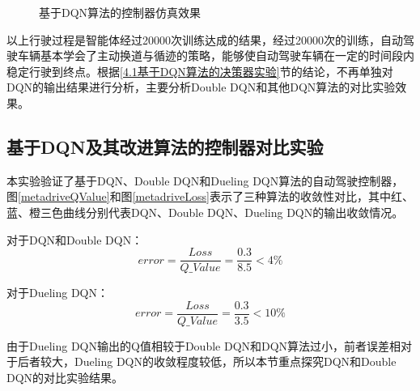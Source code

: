 \begin{figure}[htbp]
{    }
    \caption{基于DQN算法的控制器仿真效果}\label{基于DQN算法的控制器仿真效果} 
\end{figure}

以上行驶过程是智能体经过20000次训练达成的结果，经过20000次的训练，自动驾驶车辆基本学会了主动换道与循迹的策略，能够使自动驾驶车辆在一定的时间段内稳定行驶到终点。根据\ref{4.1基于DQN算法的决策器实验}节的结论，不再单独对DQN的输出结果进行分析，主要分析Double DQN和其他DQN算法的对比实验效果。

\subsection{基于DQN及其改进算法的控制器对比实验}

本实验验证了基于DQN、Double DQN和Dueling DQN算法的自动驾驶控制器，图\ref{metadriveQValue}和图\ref{metadriveLoss}表示了三种算法的收敛性对比，其中红、蓝、橙三色曲线分别代表DQN、Double DQN、Dueling DQN的输出收敛情况。

对于DQN和Double DQN：
\begin{equation}
    error = \frac{Loss}{Q\_Value} = \frac{0.3}{8.5} < 4\%
\end{equation}\label{dqn-controller-error}

对于Dueling DQN：
\begin{equation}
    error = \frac{Loss}{Q\_Value} = \frac{0.3}{3.5} < 10\%
\end{equation}\label{dueldqn-controller-error}

由于Dueling DQN输出的Q值相较于Double DQN和DQN算法过小，前者误差相对于后者较大，Dueling DQN的收敛程度较低，所以本节重点探究DQN和Double DQN的对比实验结果。

